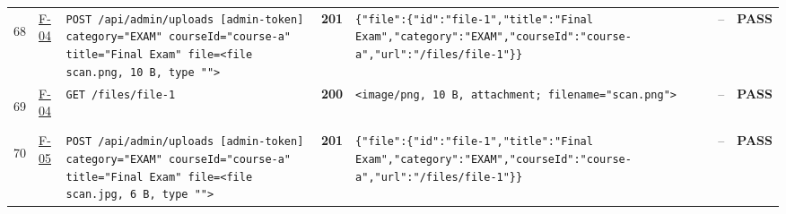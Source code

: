\documentclass[10pt,a4paper]{article}
\begin{document}
\begin{landscape}
\begin{longtable}{@{}P{0.6cm}P{0.9cm}P{8.5cm}P{1.0cm}P{6.2cm}P{4.2cm}P{1.1cm}@{}}
\hypertarget{call68}{68} & \hyperlink{test-F-04}{F-04} & \texttt{POST /\allowbreak{}api/\allowbreak{}admin/\allowbreak{}uploads [admin-\allowbreak{}token] category=\allowbreak{}"\allowbreak{}EXAM"\allowbreak{} courseId=\allowbreak{}"\allowbreak{}course-\allowbreak{}a"\allowbreak{} title=\allowbreak{}"\allowbreak{}Final Exam"\allowbreak{} file=\allowbreak{}<file scan.\allowbreak{}png,\allowbreak{} 10 B,\allowbreak{} type "\allowbreak{}"\allowbreak{}>} & \textcolor{passgreen}{\textbf{201}} & \texttt{\{"\allowbreak{}file"\allowbreak{}:\allowbreak{}\{"\allowbreak{}id"\allowbreak{}:\allowbreak{}"\allowbreak{}file-\allowbreak{}1"\allowbreak{},\allowbreak{}"\allowbreak{}title"\allowbreak{}:\allowbreak{}"\allowbreak{}Final Exam"\allowbreak{},\allowbreak{}"\allowbreak{}category"\allowbreak{}:\allowbreak{}"\allowbreak{}EXAM"\allowbreak{},\allowbreak{}"\allowbreak{}courseId"\allowbreak{}:\allowbreak{}"\allowbreak{}course-\allowbreak{}a"\allowbreak{},\allowbreak{}"\allowbreak{}url"\allowbreak{}:\allowbreak{}"\allowbreak{}/\allowbreak{}files/\allowbreak{}file-\allowbreak{}1"\allowbreak{}\}\}} & -- & \textcolor{passgreen}{\textbf{PASS}} \\
\hypertarget{call69}{69} & \hyperlink{test-F-04}{F-04} & \texttt{GET /\allowbreak{}files/\allowbreak{}file-\allowbreak{}1} & \textcolor{passgreen}{\textbf{200}} & \texttt{<image/\allowbreak{}png,\allowbreak{} 10 B,\allowbreak{} attachment; filename=\allowbreak{}"\allowbreak{}scan.\allowbreak{}png"\allowbreak{}>} & -- & \textcolor{passgreen}{\textbf{PASS}} \\
\hypertarget{call70}{70} & \hyperlink{test-F-05}{F-05} & \texttt{POST /\allowbreak{}api/\allowbreak{}admin/\allowbreak{}uploads [admin-\allowbreak{}token] category=\allowbreak{}"\allowbreak{}EXAM"\allowbreak{} courseId=\allowbreak{}"\allowbreak{}course-\allowbreak{}a"\allowbreak{} title=\allowbreak{}"\allowbreak{}Final Exam"\allowbreak{} file=\allowbreak{}<file scan.\allowbreak{}jpg,\allowbreak{} 6 B,\allowbreak{} type "\allowbreak{}"\allowbreak{}>} & \textcolor{passgreen}{\textbf{201}} & \texttt{\{"\allowbreak{}file"\allowbreak{}:\allowbreak{}\{"\allowbreak{}id"\allowbreak{}:\allowbreak{}"\allowbreak{}file-\allowbreak{}1"\allowbreak{},\allowbreak{}"\allowbreak{}title"\allowbreak{}:\allowbreak{}"\allowbreak{}Final Exam"\allowbreak{},\allowbreak{}"\allowbreak{}category"\allowbreak{}:\allowbreak{}"\allowbreak{}EXAM"\allowbreak{},\allowbreak{}"\allowbreak{}courseId"\allowbreak{}:\allowbreak{}"\allowbreak{}course-\allowbreak{}a"\allowbreak{},\allowbreak{}"\allowbreak{}url"\allowbreak{}:\allowbreak{}"\allowbreak{}/\allowbreak{}files/\allowbreak{}file-\allowbreak{}1"\allowbreak{}\}\}} & -- & \textcolor{passgreen}{\textbf{PASS}} \\

\end{longtable}
\end{landscape}
\end{document}
